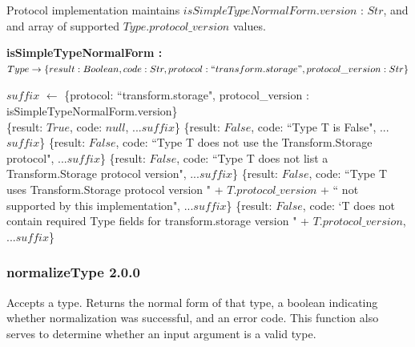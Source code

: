 \documentclass[9pt, oneside]{article}   	%
\begin{document}
Protocol implementation maintains $isSimpleTypeNormalForm.version$ : $Str$, and  and array of supported $Type.protocol\_version$ values.

\vspace{.25 cm}
\begin{algorithm}[H]
\setcounter{AlgoLine}{0}
\caption{\textbf{isSimpleTypeNormalForm : \\ $Type \rightarrow \{result: Boolean, code: Str, protocol: ``transform.storage", protocol\_version : Str\}$}}
\label{algo_isSimpleTypeNormalForm}
\label{alg:quad}
\SetAlgoLined
$suffix$ $\leftarrow$ \{protocol: ``transform.storage", protocol\_version : isSimpleTypeNormalForm.version\} \\
 {
	\Return \{result: $True$, code: $null$, ...$suffix$\}
	}
{
	\Return \{result: $False$, code: ``Type T is False", ...$suffix$\}
}
{
		{\Return \{result: $False$, code: ``Type T does not use the Transform.Storage protocol", ...$suffix$\}}
		{\Return \{result: $False$, code: ``Type T does not list a Transform.Storage protocol version", ...$suffix$\}}
		{\Return \{result: $False$, code: ``Type T uses Transform.Storage protocol version " + $T.protocol\_version$ + `` not supported by this implementation", ...$suffix$\}}
		{\Return \{result: $False$, code: `T does not contain required Type fields for transform.storage version " + $T.protocol\_version$, ...$suffix$\}}
}
\end{algorithm}


\subsubsection{normalizeType 2.0.0}\label{normalizeType_code}

Accepts a type. Returns the normal form of that type, a boolean indicating whether normalization was successful, and an error code. This function also serves to determine whether an input argument is a valid type.
\end{document}
